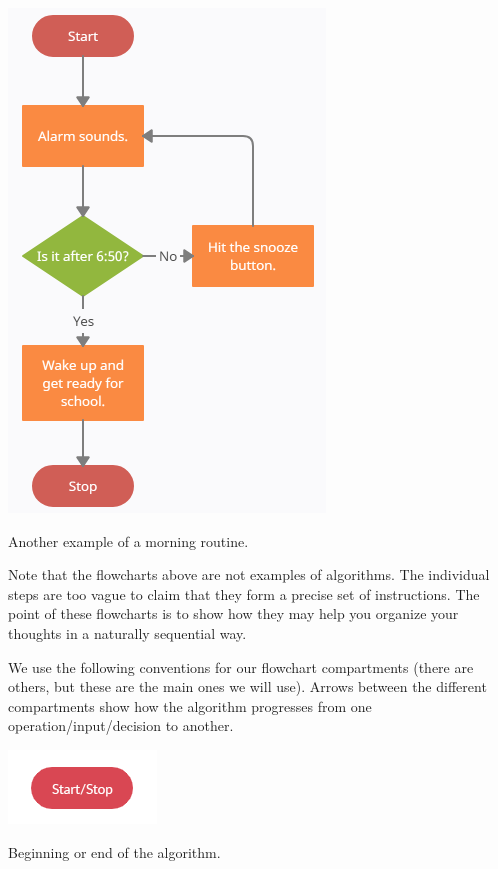 \documentclass{ximera}
\begin{document}
\begin{center}
	\includegraphics{morning2.png}
\end{center}
\begin{center}
	Another example of a morning routine.
\end{center}

Note that the flowcharts above are not examples of algorithms. The individual steps are too vague to claim that they form a precise set of instructions. The point of these flowcharts is to show how they may help you organize your thoughts in a naturally sequential way.

We use the following conventions for our flowchart compartments (there are others, but these are the main ones we will use). Arrows between the different compartments show how the algorithm progresses from one operation/input/decision to another.

\begin{center}
	\includegraphics{startstop.png}
\end{center}
\begin{center}
	Beginning or end of the algorithm.
\end{center}
\end{document}
